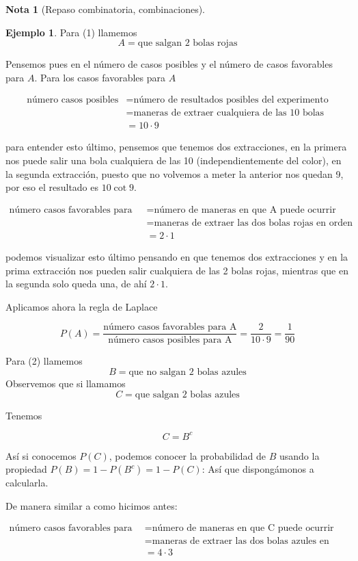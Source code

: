 \documentclass[]{book}
\theoremstyle{plain}
\theoremstyle{definition}
\newtheorem{note}[theorem]{Nota}
\newtheorem{example}[theorem]{Ejemplo}
\theoremstyle{definition} %
\begin{document}
\begin{note}[Repaso combinatoria, combinaciones]
\begin{example}
  Para (1) llamemos
  \[A = \text{que salgan 2 bolas rojas}\]

  Pensemos pues en el número de casos posibles  y el número de casos favorables para $A$.
  Para los casos favorables para $A$ 
  
  \begin{align*}
    \text{número casos posibles} &= \text{número de resultados posibles del experimento}\\
    &=\text{maneras de extraer cualquiera de las 10 bolas }\\
    &= 10 \cdot 9
  \end{align*}

  para entender esto último, pensemos que tenemos dos extracciones, 
  en la primera nos puede salir una bola cualquiera de las 10 (independientemente del color), 
  en la segunda extracción, puesto
  que no volvemos a meter la anterior nos quedan 9, por eso el resultado es $10 \cot 9$.

  \begin{align*}
    \text{número casos favorables para A} &= \text{número de maneras en que A puede ocurrir}\\
    &=\text{maneras de extraer las dos bolas rojas en orden}\\
    &= 2 \cdot 1
  \end{align*}

  podemos visualizar esto último pensando en que tenemos dos extracciones y en la prima extracción nos pueden salir 
  cualquiera de las 2 bolas rojas, mientras que en la segunda solo queda una, de ahí $2\cdot 1$.

  Aplicamos ahora la regla de Laplace 

  \[P(A) = \frac{\text{número casos favorables para A}}{\text{número casos posibles para A}} = \frac{2}{10\cdot 9}=\frac{1}{90}\]


  Para (2) llamemos
  \[B = \text{que no salgan 2 bolas azules}\]
  Observemos que si llamamos 
  \[C = \text{que salgan 2 bolas azules} \]

  Tenemos 

  \[C= B^c\] 

  Así si conocemos $P(C)$, podemos conocer la probabilidad de $B$ usando la propiedad $P(B) = 1- P(B^c) = 1- P(C)$: Así que dispongámonos a calcularla.

  De manera similar a como hicimos antes:

  \begin{align*}
    \text{número casos favorables para C} &= \text{número de maneras en que C puede ocurrir}\\
    &=\text{maneras de extraer las dos bolas azules en orden}\\
    &= 4 \cdot 3
  \end{align*}


\end{example}
\end{note}
\end{document}
